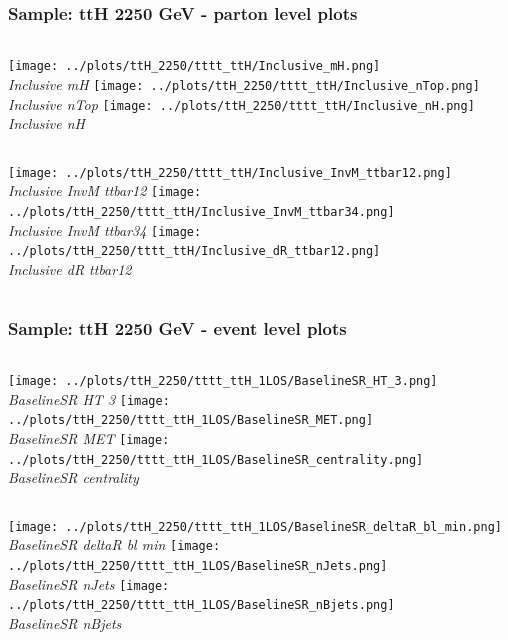 \documentclass{beamer}
\begin{document}
\begin{frame}
\frametitle{Sample: ttH 2250 GeV - parton level plots}
\begin{columns}
\texttt{[image: ../plots/ttH\_2250/tttt\_ttH/Inclusive\_mH.png]}\\
\textit{\small Inclusive mH}
\texttt{[image: ../plots/ttH\_2250/tttt\_ttH/Inclusive\_nTop.png]}\\
\textit{\small Inclusive nTop}
\texttt{[image: ../plots/ttH\_2250/tttt\_ttH/Inclusive\_nH.png]}\\
\textit{\small Inclusive nH}
\end{columns}
\begin{columns}
\texttt{[image: ../plots/ttH\_2250/tttt\_ttH/Inclusive\_InvM\_ttbar12.png]}\\
\textit{\small Inclusive InvM ttbar12}
\texttt{[image: ../plots/ttH\_2250/tttt\_ttH/Inclusive\_InvM\_ttbar34.png]}\\
\textit{\small Inclusive InvM ttbar34}
\texttt{[image: ../plots/ttH\_2250/tttt\_ttH/Inclusive\_dR\_ttbar12.png]}\\
\textit{\small Inclusive dR ttbar12}
\end{columns}
\end{frame}
\begin{frame}
\frametitle{Sample: ttH 2250 GeV - event level plots}
\begin{columns}
\texttt{[image: ../plots/ttH\_2250/tttt\_ttH\_1LOS/BaselineSR\_HT\_3.png]}\\
\textit{\small BaselineSR HT 3}
\texttt{[image: ../plots/ttH\_2250/tttt\_ttH\_1LOS/BaselineSR\_MET.png]}\\
\textit{\small BaselineSR MET}
\texttt{[image: ../plots/ttH\_2250/tttt\_ttH\_1LOS/BaselineSR\_centrality.png]}\\
\textit{\small BaselineSR centrality}
\end{columns}
\begin{columns}
\texttt{[image: ../plots/ttH\_2250/tttt\_ttH\_1LOS/BaselineSR\_deltaR\_bl\_min.png]}\\
\textit{\small BaselineSR deltaR bl min}
\texttt{[image: ../plots/ttH\_2250/tttt\_ttH\_1LOS/BaselineSR\_nJets.png]}\\
\textit{\small BaselineSR nJets}
\texttt{[image: ../plots/ttH\_2250/tttt\_ttH\_1LOS/BaselineSR\_nBjets.png]}\\
\textit{\small BaselineSR nBjets}
\end{columns}
\end{frame}
\end{document}
